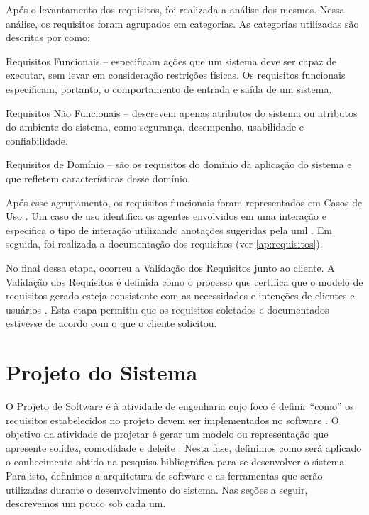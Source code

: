 Após o levantamento dos requisitos, foi realizada a análise dos mesmos. Nessa análise, os requisitos foram agrupados em categorias. As categorias utilizadas são descritas por 
 como:
\begin{alineascomponto}
    \item Requisitos Funcionais -- especificam ações que um sistema deve ser
capaz de executar, sem levar em consideração restrições físicas. Os requisitos
funcionais especificam, portanto, o comportamento de entrada e saída de um
sistema.
    \item Requisitos Não Funcionais -- descrevem apenas atributos do sistema ou
atributos do ambiente do sistema, como segurança, desempenho, usabilidade e
confiabilidade.
    \item Requisitos de Domínio -- são os requisitos do domínio da aplicação do sistema e que refletem características desse domínio.
\end{alineascomponto}

Após esse agrupamento, os requisitos funcionais foram representados em Casos de Uso \cite{jacobson92engenharia}. Um caso de uso identifica os agentes envolvidos em uma interação e especifica o tipo  de interação utilizando anotações sugeridas pela 
\gls{uml} . Em seguida, foi realizada a documentação dos requisitos (ver \autoref{ap:requisitos}).

No final dessa etapa, ocorreu a Validação dos Requisitos junto ao cliente.  A Validação dos Requisitos é definida como o processo que certifica que o modelo de requisitos gerado  esteja  consistente  
com  as  necessidades  e  intenções  de  clientes  e usuários \cite{rilston2003metodologia}. Esta etapa permitiu que os requisitos coletados e documentados estivesse de acordo com o que o 
cliente solicitou.

\section{Projeto do Sistema}

O Projeto de Software é à atividade de engenharia cujo foco é definir ``como'' os requisitos estabelecidos no projeto devem ser implementados no software \cite{pressman2006engenharia}. O objetivo da  
atividade de projetar é gerar um modelo ou representação que apresente solidez, comodidade e deleite \cite{pressman2006engenharia}. Nesta fase, definimos como será aplicado o conhecimento obtido na 
pesquisa bibliográfica para se desenvolver o sistema. Para isto, definimos a arquitetura de software e as ferramentas que serão utilizadas durante o desenvolvimento do sistema. Nas seções a seguir, 
descrevemos um pouco sob cada um.

